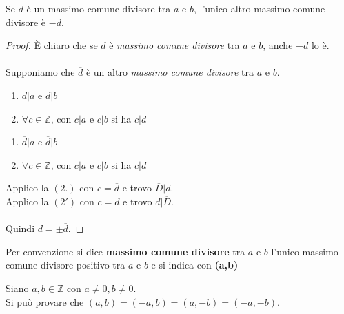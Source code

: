 \documentclass[a4paper,12pt, oneside]{book}
\begin{document}
\begin{teorema}
	Se $d$ è un massimo comune divisore tra $a$ e $b$, l'unico altro massimo comune divisore è $-d$.

	\begin{proof}
		È chiaro che se $d$ è \textit{massimo comune divisore} tra $a$ e $b$, anche $-d$ lo è.\\\\
		Supponiamo che $\overline{d}$ è un altro \textit{massimo comune divisore} tra $a$ e $b$.
		\begin{enumerate}
			\item $d|a$ e $d|b$
			\item $\forall c \in \mathbb{Z}$, con $c|a$ e $c|b$ si ha $c|d$
		\end{enumerate}
		\begin{enumerate}[label=\arabic*']
			\item $\overline{d}|a$ e $\overline{d}|b$
			\item $\forall c \in \mathbb{Z}$, con $c|a$ e $c|b$ si ha $c|\overline{d}$
		\end{enumerate}
		Applico la $(2.)$ con $c = \overline{d}$ e trovo $\overline{D}|d$.\\
		Applico la $(2')$ con $c = d$ e trovo $d|\overline{D}$.\\\\
		Quindi $d = \pm \overline{d}$.
	\end{proof}
\end{teorema}
\begin{nota}
	Per convenzione si dice \textbf{massimo comune divisore} tra $a$ e $b$ l'unico massimo comune divisore positivo tra $a$ e $b$ e si indica con \textbf{(a,b)}
\end{nota}
\begin{osservazione}
	Siano $a, b \in \mathbb{Z}$ con $a \not = 0, b \not = 0$.\\
	Si può provare che $(a,b) = (-a,b) = (a,-b) = (-a,-b)$.
\end{osservazione}
\end{document}
